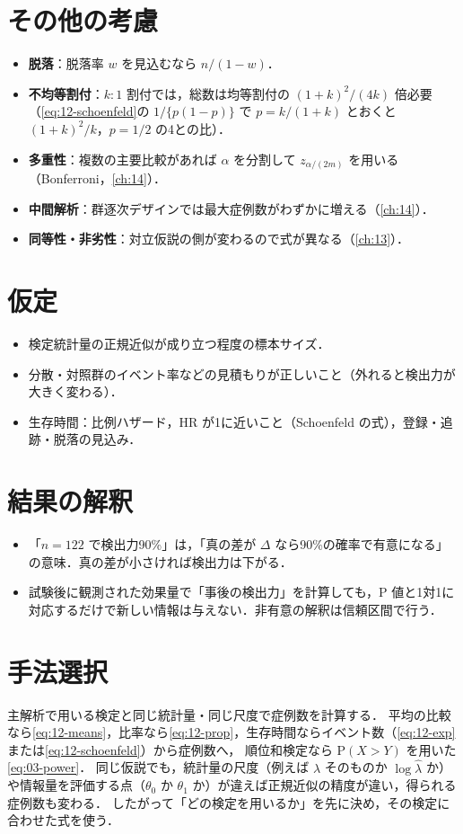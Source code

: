 \documentclass[a4paper,11pt,openany]{ltjsbook}
\newcommand{\Prob}{\mathrm{P}}
\newcommand{\HR}{\mathrm{HR}}
\begin{document}
\section{その他の考慮}\label{sec:12-other}
\begin{itemize}
\item \textbf{脱落}：脱落率 $w$ を見込むなら $n/(1-w)$．
\item \textbf{不均等割付}：$k:1$ 割付では，総数は均等割付の $(1+k)^2/(4k)$ 倍必要（\cref{eq:12-schoenfeld}の $1/\{p(1-p)\}$ で $p=k/(1+k)$ とおくと $(1+k)^2/k$，$p=1/2$ の4との比）．
\item \textbf{多重性}：複数の主要比較があれば $\alpha$ を分割して $z_{\alpha/(2m)}$ を用いる（Bonferroni，\cref{ch:14}）．
\item \textbf{中間解析}：群逐次デザインでは最大症例数がわずかに増える（\cref{ch:14}）．
\item \textbf{同等性・非劣性}：対立仮説の側が変わるので式が異なる（\cref{ch:13}）．
\end{itemize}

\section{仮定}\label{sec:12-assump}
\begin{itemize}
\item 検定統計量の正規近似が成り立つ程度の標本サイズ．
\item 分散・対照群のイベント率などの見積もりが正しいこと（外れると検出力が大きく変わる）．
\item 生存時間：比例ハザード，$\HR$ が1に近いこと（Schoenfeld の式），登録・追跡・脱落の見込み．
\end{itemize}

\section{結果の解釈}\label{sec:12-interp}
\begin{itemize}
\item 「$n=122$ で検出力90\%」は，「真の差が $\Delta$ なら90\%の確率で有意になる」の意味．真の差が小さければ検出力は下がる．
\item 試験後に観測された効果量で「事後の検出力」を計算しても，P 値と1対1に対応するだけで新しい情報は与えない．非有意の解釈は信頼区間で行う．
\end{itemize}

\section{手法選択}\label{sec:12-choice}
主解析で用いる検定と同じ統計量・同じ尺度で症例数を計算する．
平均の比較なら\cref{eq:12-means}，比率なら\cref{eq:12-prop}，生存時間ならイベント数（\cref{eq:12-exp}または\cref{eq:12-schoenfeld}）から症例数へ，
順位和検定なら $\Prob(X>Y)$ を用いた\cref{eq:03-power}．
同じ仮説でも，統計量の尺度（例えば $\hat\lambda$ そのものか $\log\hat\lambda$ か）や情報量を評価する点（$\theta_0$ か $\theta_1$ か）が違えば正規近似の精度が違い，得られる症例数も変わる．
したがって「どの検定を用いるか」を先に決め，その検定に合わせた式を使う．
\end{document}
